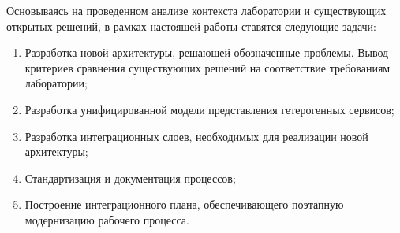 \documentclass[../thesis.tex]{subfiles}
\begin{document}
	Основываясь на проведенном анализе контекста лаборатории и существующих открытых решений, в
	рамках настоящей работы ставятся следующие задачи:

	\begin{enumerate}
		\item Разработка новой архитектуры, решающей обозначенные проблемы. Вывод критериев сравнения
			существующих решений на соответствие требованиям лаборатории;

		\item Разработка унифицированной модели представления гетерогенных сервисов;

		\item Разработка интеграционных слоев, необходимых для реализации новой архитектуры;

		\item Стандартизация и документация процессов;

		\item Построение интеграционного плана, обеспечивающего поэтапную модернизацию рабочего
			процесса.
	\end{enumerate}
\end{document}
